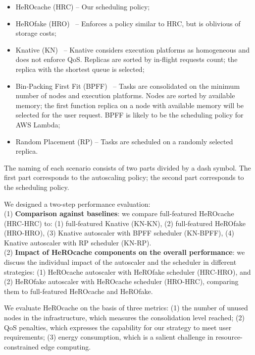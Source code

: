 \begin{itemize}
    \item HeROcache (HRC) -- Our scheduling policy;%
    \item HeROfake (HRO)~\cite{herofake} -- Enforces a policy similar to HRC, but is oblivious of storage costs;%
    \item Knative (KN)~\cite{knative} -- Knative considers execution platforms as homogeneous and does not enforce QoS. Replicas are sorted by in-flight requests count; the replica with the shortest queue is selected;
    \item Bin-Packing First Fit (BPFF)~\cite{wangPeekingCurtainsServerlessb} -- Tasks are consolidated on the minimum number of nodes and execution platforms. Nodes are sorted by available memory; the first function replica on a node with available memory will be selected for the user request. BPFF is likely to be the scheduling policy for AWS Lambda;
    \item Random Placement (RP) -- Tasks are scheduled on a randomly selected replica.
\end{itemize}

The naming of each scenario consists of two parts divided by a dash symbol. The first part corresponds to the autoscaling policy; the second part corresponds to the scheduling policy.%

We designed a two-step performance evaluation:\\
(1) \textbf{Comparison against baselines}: we compare full-featured HeROcache (HRC-HRC) to: (1) full-featured Knative (KN-KN), (2) full-featured HeROfake (HRO-HRO), (3) Knative autoscaler with BPFF scheduler (KN-BPFF), (4) Knative autoscaler with RP scheduler (KN-RP).\\
(2) \textbf{Impact of HeROcache components on the overall performance}: we discuss the individual impact of the autoscaler and the scheduler in different strategies: (1) HeROcache autoscaler with HeROfake scheduler (HRC-HRO), and (2) HeROfake autoscaler with HeROcache scheduler (HRO-HRC), comparing them to full-featured HeROcache and HeROfake.

We evaluate HeROcache on the basis of three  metrics: (1) the number of unused nodes in the infrastructure, which measures the consolidation level reached; (2) QoS penalties, which expresses the capability for our strategy to meet user requirements; (3) energy consumption, which is a salient challenge in resource-constrained edge computing.

